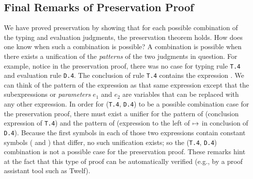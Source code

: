 \subsection{Final Remarks of Preservation Proof}
We have proved preservation by showing that for
each possible combination of the typing and evaluation
judgments, the preservation theorem holds.
How does one know when such a combination is possible?
A combination is possible when there exists a unification
of the \emph{patterns} of the two judgments in question.
For example, notice in the preservation proof, there
was no case for typing rule \texttt{T.4} and evaluation
rule \texttt{D.4}.
The conclusion of rule \texttt{T.4} contains the expression
.
We can think of the pattern of the expression 
as that same expression except that the subexpressions or \emph{parameters}
$e_1$ and $e_2$ are variables that can be replaced with
any other expression.
In order for (\texttt{T.4}, \texttt{D.4}) to be a possible
combination case for the preservation proof, 
there must exist a unifier for the pattern of 
(conclusion expression of \texttt{T.4})
and the pattern of 
(expression to the left of $\mapsto$ in conclusion of \texttt{D.4}).
Because the first symbols in each of those two expressions contain
constant symbols (\code{+} and \code{\^{}}) that differ,
no such unification exists; so the (\texttt{T.4}, \texttt{D.4})
combination is not a possible case for the preservation proof.
These remarks hint at the fact that this type of proof can be
automatically verified (e.g., by a proof assistant tool such as Twelf).


